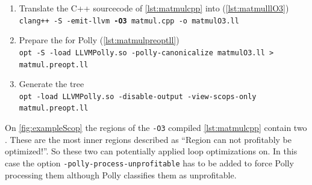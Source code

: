 \begin{enumerate}
    \item Translate the C++ sourcecode of \autoref{lst:matmulcpp} into \llvmir (\autoref{lst:matmulllO3})\\
        \texttt{clang++ -S -emit-llvm \textbf{-O3} matmul.cpp -o matmulO3.ll}
    \item Prepare the \llvmir for Polly (\autoref{lst:matmulpreoptll})\\
        \texttt{opt -S -load LLVMPolly.so -polly-canonicalize matmulO3.ll > matmul.preopt.ll}
    \item Generate the \scop tree\\
        \texttt{opt -load LLVMPolly.so -disable-output -view-scops-only matmul.preopt.ll}
\end{enumerate}
On \autoref{fig:exampleScop} the regions of the \texttt{-O3} compiled \autoref{lst:matmulcpp} contain two \scops.
These are the most inner regions described as \enquote{Region can not profitably be optimized!}.
So these two can potentially applied loop optimizations on.
In this case the option \texttt{-polly-process-unprofitable} has to be added to force Polly processing them although Polly classifies them as unprofitable.

